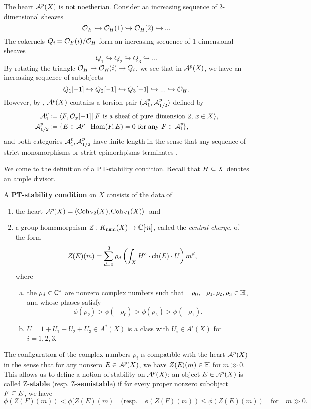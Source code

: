 \begin{rmk}
    The heart $\mathcal{A}^p(X)$ is not noetherian. Consider an increasing sequence of 2-dimensional sheaves
    \[ \mathcal{O}_H \hookrightarrow \mathcal{O}_H(1) \hookrightarrow \mathcal{O}_H(2) \hookrightarrow ... \]
    The cokernels $Q_i = \mathcal{O}_H(i)/\mathcal{O}_H$ form an increasing sequence of 1-dimensional sheaves
    \[ Q_1 \hookrightarrow Q_2 \hookrightarrow Q_3 \hookrightarrow ... \]
    By rotating the triangle $\mathcal{O}_H \to \mathcal{O}_H(i) \to Q_i$, we see that in $\mathcal{A}^p(X)$, we have an increasing sequence of subobjects
    \[ Q_1[-1] \hookrightarrow Q_2[-1] \hookrightarrow Q_3[-1] \hookrightarrow ... \hookrightarrow \mathcal{O}_H. \]
    However, by \cite[Lemma 2.16]{toda-limitstable}, $\mathcal{A}^p(X)$ contains a torsion pair $(\mathcal{A}^p_1, \mathcal{A}^p_{1/2})$ defined by
    \begin{align*}
        \mathcal{A}^p_1 & \coloneqq \langle F, \mathcal{O}_x[-1] \,|\, F \text{ is a sheaf of pure dimension 2, } x \in X \rangle, \\
        \mathcal{A}^p_{1/2} & \coloneqq \{ E \in \mathcal{A}^p \;|\; \mathrm{Hom}(F, E) = 0 \text{ for any } F \in \mathcal{A}^p_1 \},
    \end{align*}
    and both categories $\mathcal{A}^p_1, \mathcal{A}^p_{1/2}$ have finite length in the sense that any sequence of strict monomorphisms or strict epimorhpisms terminates \cite[Lemma 2.19]{toda-limitstable}.
\end{rmk}

We come to the definition of a PT-stability condition. Recall that $H \subseteq X$ denotes an ample divisor.
\begin{defn}\label{defn:PTstab}
    A \textbf{PT-stability condition} on $X$ consists of the data of
    \begin{enumerate}[(1)]
        \item the heart $\mathcal{A}^p(X) = \langle \operatorname{\mathrm{Coh}}_{\ge 2}(X), \operatorname{\mathrm{Coh}}_{\le 1}(X) \rangle$, and
        \item a group homomorphism $Z: K_{\mathrm{num}}(X) \to \mathbb{C}[m]$, called the \emph{central charge}, of the form
        \[ Z(E)(m) = \sum_{d=0}^3 \rho_d \left(\int_X H^d \cdot \operatorname{\mathrm{ch}}(E) \cdot U\right) m^d, \]
        where
        \begin{enumerate}[(a)]
            \item the $\rho_d \in \mathbb{C}^*$ are nonzero complex numbers such that $-\rho_0, -\rho_1, \rho_2, \rho_3 \in \mathbb{H}$, and whose phases satisfy
            \[ \phi(\rho_2) > \phi(-\rho_0) > \phi(\rho_3) > \phi(-\rho_1). \]
            \item $U = 1 + U_1 + U_2 + U_3 \in A^*(X)$ is a class with $U_i \in A^i(X)$ for $i = 1, 2, 3$.
        \end{enumerate}
    \end{enumerate}
\end{defn}
The configuration of the complex numbers $\rho_i$ is compatible with the heart $\mathcal{A}^p(X)$ in the sense that for any nonzero $E \in \mathcal{A}^p(X)$, we have $Z(E)(m) \in \mathbb{H}$ for $m \gg 0$. This allows us to define a notion of stability on $\mathcal{A}^p(X)$: an object $E \in \mathcal{A}^p(X)$ is called Z-\textbf{stable} (resp. Z-\textbf{semistable}) if for every proper nonzero subobject $F \subseteq E$, we have 
\[ \phi(Z(F)(m)) < \phi(Z(E)(m) \quad (\mathrm{resp.} \quad \phi(Z(F)(m)) \le \phi(Z(E)(m)) \quad \mathrm{for} \quad m \gg 0.  \]

